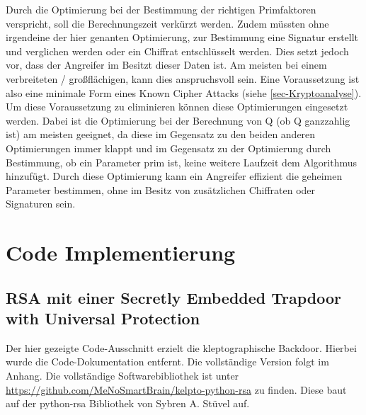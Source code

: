             Durch die Optimierung bei der Bestimmung der richtigen Primfaktoren verspricht, soll die Berechnungszeit verkürzt werden. Zudem müssten ohne irgendeine der hier genanten Optimierung, zur Bestimmung eine Signatur erstellt und verglichen werden oder ein Chiffrat entschlüsselt werden. Dies setzt jedoch vor, dass der Angreifer im Besitzt dieser Daten ist. Am meisten bei einem verbreiteten / großflächigen, kann dies anspruchsvoll sein. Eine Voraussetzung ist also eine minimale Form eines Known Cipher Attacks (siehe \ref{sec-Kryptoanalyse}).
            Um diese Voraussetzung zu eliminieren können diese Optimierungen eingesetzt werden. 
            Dabei ist die Optimierung bei der Berechnung von Q (ob Q ganzzahlig ist) am meisten geeignet, da diese im Gegensatz zu den beiden anderen Optimierungen immer klappt und im Gegensatz zu der Optimierung durch Bestimmung, ob ein Parameter prim ist, keine weitere Laufzeit dem Algorithmus hinzufügt.
            Durch diese Optimierung kann ein Angreifer effizient die geheimen Parameter bestimmen, ohne im Besitz von zusätzlichen Chiffraten oder Signaturen sein.

        
    \section{Code Implementierung}
        \subsection{RSA mit einer Secretly Embedded Trapdoor with Universal Protection}

            Der hier gezeigte Code-Ausschnitt erzielt die kleptographische Backdoor. Hierbei wurde die Code-Dokumentation entfernt. Die vollständige Version folgt im Anhang. Die vollständige Softwarebibliothek ist unter \url{https://github.com/MeNoSmartBrain/kelpto-python-rsa} zu finden. Diese baut auf der python-rsa Bibliothek von Sybren A. Stüvel auf.
        
